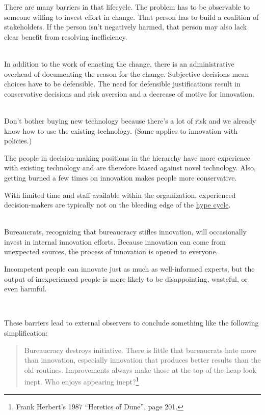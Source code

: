 There are many barriers in that lifecycle. The problem has to be observable to someone willing to invest effort in change. That person has to build a coalition of stakeholders. If the person isn't negatively harmed, that person may also lack clear benefit from resolving inefficiency. 

\ \\

In addition to the work of enacting the change, there is an administrative overhead of documenting the reason for the change. 
Subjective decisions mean choices have to be defensible. 
The need for defensible justifications result in conservative decisions and risk aversion and a decrease of motive for innovation. 

\ \\

Don't bother buying new technology because there's a lot of risk and we already know how to use the existing technology. (Same applies to innovation with policies.)

The people in decision-making positions in the hierarchy have more experience with existing technology and are therefore biased against novel technology. Also, getting burned a few times on innovation makes people more conservative.

With limited time and staff available within the organization, experienced decision-makers are typically not on the bleeding edge of the \href{https://en.wikipedia.org/wiki/Gartner_hype_cycle}{hype cycle}.

\ \\

Bureaucrats, recognizing that bureaucracy stifles innovation, will occasionally invest in internal innovation efforts. Because innovation can come from unexpected sources, the process of innovation is opened to everyone. 

Incompetent people can innovate just as much as well-informed experts, but the output of inexperienced people is more likely to be disappointing, wasteful, or even harmful. 

\ \\

\begin{samepage}
These barriers lead to external observers to conclude something like the following simplification:
\begin{quote}
Bureaucracy destroys initiative. There is little that bureaucrats hate more than innovation, especially innovation that produces better results than the old routines.
Improvements always make those at the top of the heap look inept. Who enjoys appearing inept?\footnote{Frank Herbert's 1987 ``Heretics of Dune'', page 201.}%
\end{quote}
\end{samepage}

